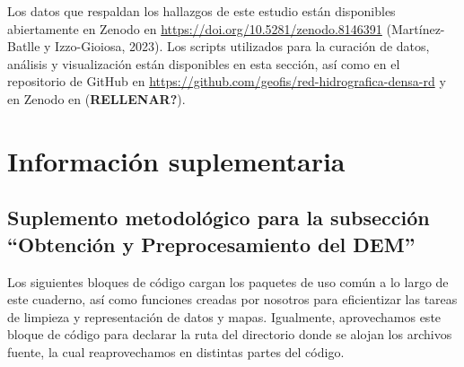 \documentclass[spanish]{article}
\begin{document}
Los datos que respaldan los hallazgos de este estudio están disponibles
abiertamente en Zenodo en \url{https://doi.org/10.5281/zenodo.8146391}
(Martínez-Batlle y Izzo-Gioiosa, 2023). Los scripts utilizados para la
curación de datos, análisis y visualización están disponibles en esta
sección, así como en el repositorio de GitHub en
\url{https://github.com/geofis/red-hidrografica-densa-rd} y en Zenodo en
\url{} (\textbf{RELLENAR?}).

\newpage

\hypertarget{infosupl}{%
\section*{Información suplementaria}\label{infosupl}}

\beginsupplement

\hypertarget{suplemento-metodoluxf3gico-para-la-subsecciuxf3n-obtenciuxf3n-y-preprocesamiento-del-dem}{%
\subsection*{Suplemento metodológico para la subsección ``Obtención y
Preprocesamiento del
DEM''}\label{suplemento-metodoluxf3gico-para-la-subsecciuxf3n-obtenciuxf3n-y-preprocesamiento-del-dem}}

Los siguientes bloques de código cargan los paquetes de uso común a lo
largo de este cuaderno, así como funciones creadas por nosotros para
eficientizar las tareas de limpieza y representación de datos y mapas.
Igualmente, aprovechamos este bloque de código para declarar la ruta del
directorio donde se alojan los archivos fuente, la cual reaprovechamos
en distintas partes del código.
\end{document}
